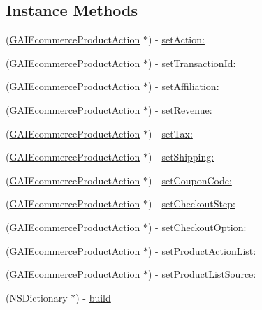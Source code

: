 \subsection*{Instance Methods}
\begin{DoxyCompactItemize}
\item 
(\hyperlink{interface_g_a_i_ecommerce_product_action}{G\+A\+I\+Ecommerce\+Product\+Action} $\ast$) -\/ \hyperlink{interface_g_a_i_ecommerce_product_action_ac8891a6025102bd1b8e2071c2ee92d64}{set\+Action\+:}
\item 
(\hyperlink{interface_g_a_i_ecommerce_product_action}{G\+A\+I\+Ecommerce\+Product\+Action} $\ast$) -\/ \hyperlink{interface_g_a_i_ecommerce_product_action_a94b1cacc99d153cbe04a92cfee5618d7}{set\+Transaction\+Id\+:}
\item 
(\hyperlink{interface_g_a_i_ecommerce_product_action}{G\+A\+I\+Ecommerce\+Product\+Action} $\ast$) -\/ \hyperlink{interface_g_a_i_ecommerce_product_action_acb7fd9fce90be149a9dfde99a7ccb7f1}{set\+Affiliation\+:}
\item 
(\hyperlink{interface_g_a_i_ecommerce_product_action}{G\+A\+I\+Ecommerce\+Product\+Action} $\ast$) -\/ \hyperlink{interface_g_a_i_ecommerce_product_action_abcb5406f9f38402a23b26174a7af6206}{set\+Revenue\+:}
\item 
(\hyperlink{interface_g_a_i_ecommerce_product_action}{G\+A\+I\+Ecommerce\+Product\+Action} $\ast$) -\/ \hyperlink{interface_g_a_i_ecommerce_product_action_ab17db217703315dc44cca39c272c7c00}{set\+Tax\+:}
\item 
(\hyperlink{interface_g_a_i_ecommerce_product_action}{G\+A\+I\+Ecommerce\+Product\+Action} $\ast$) -\/ \hyperlink{interface_g_a_i_ecommerce_product_action_a6419c96e6e0e871bb0ab0115e9358ac2}{set\+Shipping\+:}
\item 
(\hyperlink{interface_g_a_i_ecommerce_product_action}{G\+A\+I\+Ecommerce\+Product\+Action} $\ast$) -\/ \hyperlink{interface_g_a_i_ecommerce_product_action_a4ef010bcb348cc92071fac8ee45cb488}{set\+Coupon\+Code\+:}
\item 
(\hyperlink{interface_g_a_i_ecommerce_product_action}{G\+A\+I\+Ecommerce\+Product\+Action} $\ast$) -\/ \hyperlink{interface_g_a_i_ecommerce_product_action_ac4bcb2439fb133fb049f59c740d94dde}{set\+Checkout\+Step\+:}
\item 
(\hyperlink{interface_g_a_i_ecommerce_product_action}{G\+A\+I\+Ecommerce\+Product\+Action} $\ast$) -\/ \hyperlink{interface_g_a_i_ecommerce_product_action_a1f4cfccfdef393473652746e0e81209c}{set\+Checkout\+Option\+:}
\item 
(\hyperlink{interface_g_a_i_ecommerce_product_action}{G\+A\+I\+Ecommerce\+Product\+Action} $\ast$) -\/ \hyperlink{interface_g_a_i_ecommerce_product_action_a96a1aaedd949a9fb524916ef830728c0}{set\+Product\+Action\+List\+:}
\item 
(\hyperlink{interface_g_a_i_ecommerce_product_action}{G\+A\+I\+Ecommerce\+Product\+Action} $\ast$) -\/ \hyperlink{interface_g_a_i_ecommerce_product_action_a9fd6cd67e0032ed2cec4e4ba222146c8}{set\+Product\+List\+Source\+:}
\item 
(N\+S\+Dictionary $\ast$) -\/ \hyperlink{interface_g_a_i_ecommerce_product_action_ab5070c54e30543649778dede1145ed33}{build}
\end{DoxyCompactItemize}


